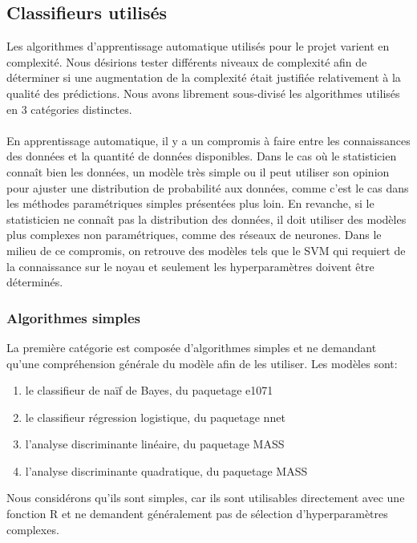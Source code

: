 \subsection{Classifieurs utilisés}
Les algorithmes d'apprentissage automatique utilisés pour le projet varient en complexité. Nous désirions tester différents niveaux de complexité afin de déterminer si une augmentation de la complexité était justifiée relativement à la qualité des prédictions. Nous avons librement sous-divisé les algorithmes utilisés en 3 catégories distinctes. \\ \\
En apprentissage automatique, il y a un compromis à faire entre les connaissances des données et la quantité de données disponibles. Dans le cas où le statisticien connaît bien les données, un modèle très simple ou il peut utiliser son opinion pour ajuster une distribution de probabilité aux données, comme c'est le cas dans les méthodes paramétriques simples présentées plus loin. En revanche, si le statisticien ne connaît pas la distribution des données, il doit utiliser des modèles plus complexes non paramétriques, comme des réseaux de neurones. Dans le milieu de ce compromis, on retrouve des modèles tels que le SVM qui requiert de la connaissance sur le noyau et seulement les hyperparamètres doivent être déterminés.

\subsubsection{Algorithmes simples}
La première catégorie est composée d'algorithmes simples et ne demandant qu'une compréhension générale du modèle afin de les utiliser. Les modèles sont:

\begin{enumerate}
  \item le classifieur de naïf de Bayes, du paquetage e1071 \cite{packagee1071}
  \item le classifieur régression logistique, du paquetage nnet \cite{packagennet} 
  \item l'analyse discriminante linéaire, du paquetage MASS \cite{packageMASS}
  \item l'analyse discriminante quadratique, du paquetage MASS  \cite{packageMASS}
\end{enumerate}

Nous considérons qu'ils sont simples, car ils sont utilisables directement avec une fonction R et ne demandent généralement pas de sélection d'hyperparamètres complexes.

